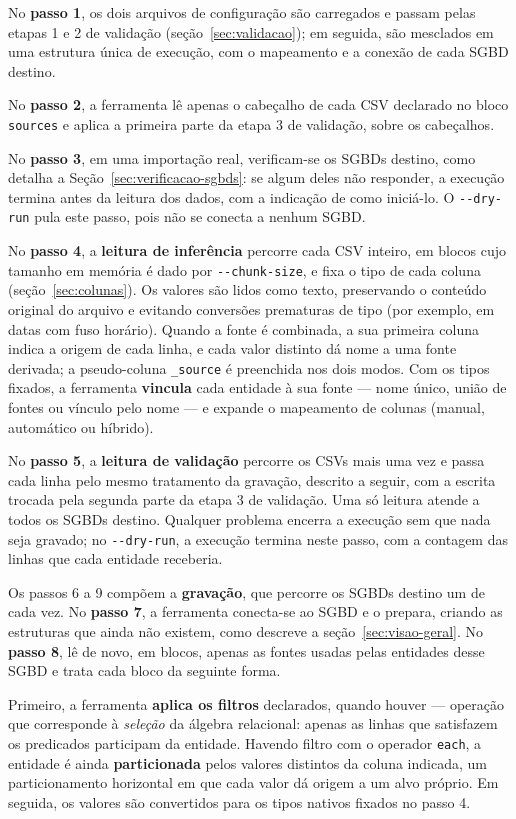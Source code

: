No \textbf{passo 1}, os dois arquivos de configuração são carregados e passam pelas
etapas 1 e 2 de validação (seção~\ref{sec:validacao}); em seguida, são mesclados em uma
estrutura única de execução, com o mapeamento e a conexão de cada SGBD destino.

No \textbf{passo 2}, a ferramenta lê apenas o cabeçalho de cada CSV declarado no bloco
\texttt{sources} e aplica a primeira parte da etapa 3 de validação, sobre os cabeçalhos.

No \textbf{passo 3}, em uma importação real, verificam-se os SGBDs destino, como detalha
a Seção~\ref{sec:verificacao-sgbds}: se algum deles não responder, a execução termina
antes da leitura dos dados, com a indicação de como iniciá-lo. O \texttt{-{}-dry-run}
pula este passo, pois não se conecta a nenhum SGBD.

No \textbf{passo 4}, a \textbf{leitura de inferência} percorre cada CSV inteiro, em
blocos cujo tamanho em memória é dado por \texttt{-{}-chunk-size}, e fixa o tipo de cada
coluna (seção~\ref{sec:colunas}). Os valores são lidos como texto, preservando o conteúdo
original do arquivo e evitando conversões prematuras de tipo (por exemplo, em datas com
fuso horário). Quando a fonte é combinada, a sua primeira coluna indica a origem de cada
linha, e cada valor distinto dá nome a uma fonte derivada; a pseudo-coluna
\texttt{\_source} é preenchida nos dois modos. Com os tipos fixados, a ferramenta
\textbf{vincula} cada entidade à sua fonte --- nome único, união de fontes ou vínculo
pelo nome --- e expande o mapeamento de colunas (manual, automático ou híbrido).

No \textbf{passo 5}, a \textbf{leitura de validação} percorre os CSVs mais uma vez e
passa cada linha pelo mesmo tratamento da gravação, descrito a seguir, com a escrita
trocada pela segunda parte da etapa 3 de validação. Uma só leitura atende a todos os SGBDs
destino. Qualquer problema encerra a execução sem que nada seja gravado; no
\texttt{-{}-dry-run}, a execução termina neste passo, com a contagem das linhas que cada
entidade receberia.

Os passos 6 a 9 compõem a \textbf{gravação}, que percorre os SGBDs destino um de cada
vez. No \textbf{passo 7}, a ferramenta conecta-se ao SGBD e o prepara, criando as
estruturas que ainda não existem, como descreve a seção~\ref{sec:visao-geral}. No
\textbf{passo 8}, lê de novo, em blocos, apenas as fontes usadas pelas entidades desse
SGBD e trata cada bloco da seguinte forma.

Primeiro, a ferramenta \textbf{aplica os filtros} declarados, quando houver ---
operação que corresponde à \textit{seleção} da álgebra relacional: apenas as linhas que
satisfazem os predicados participam da entidade. Havendo filtro com o operador
\texttt{each}, a entidade é ainda \textbf{particionada} pelos valores distintos da coluna
indicada, um particionamento horizontal em que cada valor dá origem a um alvo próprio.
Em seguida, os valores são convertidos para os tipos nativos fixados no passo 4.

